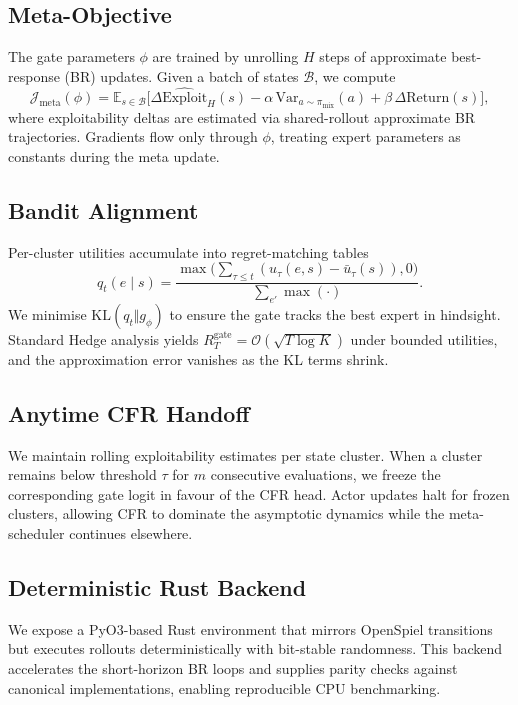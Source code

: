 \documentclass{icml2024}
\begin{document}
\subsection{Meta-Objective}
The gate parameters $\phi$ are trained by unrolling $H$ steps of approximate best-response (BR) updates. Given a batch of states $\mathcal{B}$, we compute
\begin{equation}
\mathcal{J}_{\text{meta}}(\phi) = \mathbb{E}_{s\in\mathcal{B}}\Big[\Delta \widehat{\text{Exploit}}_{H}(s) - \alpha\,\mathrm{Var}_{a \sim \pi_{\text{mix}}}(a) + \beta\,\Delta \text{Return}(s)\Big],
\end{equation}
where exploitability deltas are estimated via shared-rollout approximate BR trajectories. Gradients flow only through $\phi$, treating expert parameters as constants during the meta update.

\subsection{Bandit Alignment}
Per-cluster utilities accumulate into regret-matching tables
\begin{equation}
q_t(e \mid s) = \frac{\max\big(\sum_{\tau\le t} (u_\tau(e,s) - \bar{u}_\tau(s)), 0\big)}{\sum_{e'} \max(\cdot)}.
\end{equation}
We minimise $\mathrm{KL}(q_t \Vert g_\phi)$ to ensure the gate tracks the best expert in hindsight. Standard Hedge analysis yields $R_T^{\text{gate}} = \mathcal{O}(\sqrt{T\log K})$ under bounded utilities, and the approximation error vanishes as the KL terms shrink.

\subsection{Anytime CFR Handoff}
We maintain rolling exploitability estimates per state cluster. When a cluster remains below threshold $\tau$ for $m$ consecutive evaluations, we freeze the corresponding gate logit in favour of the CFR head. Actor updates halt for frozen clusters, allowing CFR to dominate the asymptotic dynamics while the meta-scheduler continues elsewhere.

\subsection{Deterministic Rust Backend}
We expose a PyO3-based Rust environment that mirrors OpenSpiel transitions but executes rollouts deterministically with bit-stable randomness. This backend accelerates the short-horizon BR loops and supplies parity checks against canonical implementations, enabling reproducible CPU benchmarking.
\end{document}
